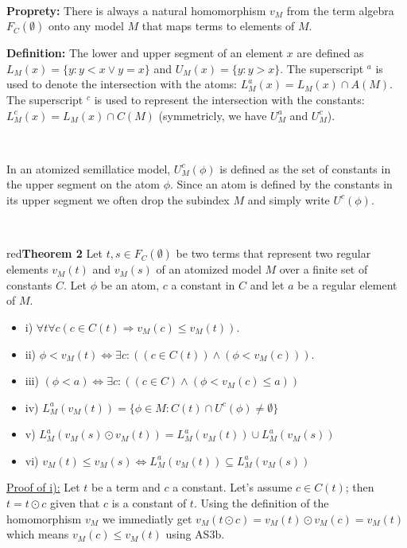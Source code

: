 \documentclass[a4paper, 11pt]{article}
\begin{document}
\

\begin{tcolorbox} 
	\textbf{Proprety:} There is always a natural homomorphism $v_M$ from the term algebra $F_C(\emptyset)$ onto any model $M$ that maps terms to elements of $M$.
\end{tcolorbox}

\begin{tcolorbox} 
	\textbf{Definition:} The lower and upper segment of an element $x$ are defined as $L_M(x) =\{y: y < x \lor y = x\}$ and $U_M(x) =\{y : y > x\}$. The superscript $^a$ is used to denote the intersection with the atoms: $L_M^a(x) = L_M(x) \cap A(M)$. The superscript $^c$ is used to represent the intersection with the constants: $L_M^c(x) = L_M(x) \cap C(M)$ (symmetricly, we have $U_M^a$ and $U_M^c$).

	\

	In an atomized semillatice model, $U_M^c(\phi)$ is defined as the set of constants in the upper segment on the atom $\phi$. Since an atom is defined by the constants in its upper segment we often drop the subindex $M$ and simply write $U^c(\phi)$.
\end{tcolorbox} 
\

\begin{mybox}{red}{\textbf{Theorem 2}}
	Let $t,s \in F_C(\emptyset)$ be two terms that represent two regular elements $v_M(t)$ and $v_M(s)$ of an atomized model $M$ over a finite set of constants $C$. Let $\phi$ be an atom, $c$ a constant in $C$ and let $a$ be a regular element of $M$.

	\begin{itemize} 
		\item i) $\forall t \forall c ( c \in C(t) \Rightarrow v_M(c) \leq v_M(t))$.
		\item ii) $\phi < v_M(t) \Leftrightarrow \exists c: ((c \in C(t)) \land (\phi < v_M(c)))$.
		\item iii) $(\phi < a) \Leftrightarrow \exists c: ((c \in C) \land (\phi < v_M(c) \leq a))$
		\item iv) $L_M^a(v_M(t)) =\{\phi \in M : C(t) \cap U^c(\phi) \neq \emptyset\}$
		\item v) $L_M^a(v_M(s) \odot v_M(t)) = L_M^a(v_M(t)) \cup L_M^a(v_M(s))$
		\item vi) $v_M(t) \leq v_M(s) \Leftrightarrow L_M^a(v_M(t)) \subseteq L_M^a(v_M(s))$
	\end{itemize}
\end{mybox}

\noindent 
\underline{Proof of i):} Let $t$ be a term and $c$ a constant. Let's assume $c \in C(t)$; then $t = t \odot c$ given that $c$ is a constant of $t$. Using the definition of the homomorphism $v_M$ we immediatly get $v_M(t \odot c) = v_M(t) \odot v_M(c) = v_M(t)$ which means $v_M(c) \leq v_M(t)$ using AS3b.
\end{document}
